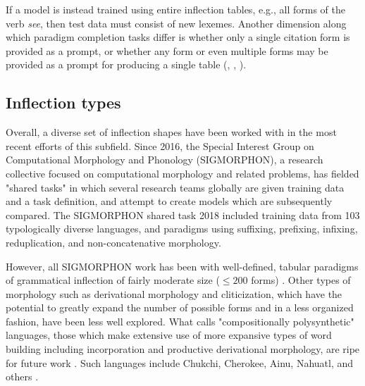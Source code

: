 If a model is instead trained using entire inflection tables, e.g., all forms of the verb \textit{see}, then test data must consist of new lexemes. Another dimension along which paradigm completion tasks differ is whether only a single citation form is provided as a prompt, or whether any form or even multiple forms may be provided as a prompt for producing a single table (\cite{Hulden2014}, \cite{Ahlberg2015}, \cite{Cotterell2017a}).

\subsection{Inflection types}

Overall, a diverse set of inflection shapes have been worked with in the most recent efforts of this subfield. Since 2016, the Special Interest Group on Computational Morphology and Phonology (SIGMORPHON), a research collective focused on computational morphology and related problems, has fielded "shared tasks" in which several research teams globally are given training data and a task definition, and attempt to create models which are subsequently compared. The SIGMORPHON shared task 2018 included training data from 103 typologically diverse languages, and paradigms using suffixing, prefixing, infixing, reduplication, and non-concatenative morphology. 

However, all SIGMORPHON work has been with well-defined, tabular paradigms of grammatical inflection of fairly moderate size ($\leq 200$ forms) \parencite{Cotterell2018b}. Other types of morphology such as derivational morphology and cliticization, which have the potential to greatly expand the number of possible forms and in a less organized fashion, have been less well explored. What \cite{Mattissen2004} calls "compositionally polysynthetic" languages, those which make extensive use of more expansive types of word building including incorporation and productive derivational morphology, are ripe for future work \parencite{Cotterell2016}. Such languages include Chukchi, Cherokee, Ainu, Nahuatl, and others \parencite{Mattissen2004}.

